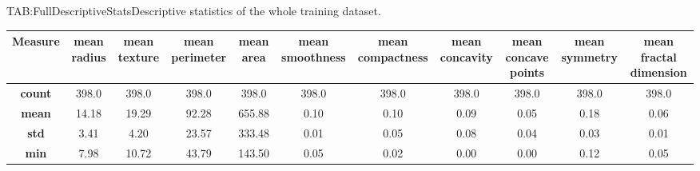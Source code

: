 
\begin{landscape}


    \begin{table}[Complete Descriptive Statistics]{TAB:FullDescriptiveStats}{Descriptive statistics of the whole training dataset.}
        \small
        \begin{adjustbox}{width=1\linewidth}
            \begin{tabular}{|c|*{10}{c|}}
                \hline
                \textbf{Measure} & \textbf{\bfseries mean radius} & \textbf{\bfseries mean texture} & \textbf{\bfseries mean perimeter} & \textbf{\bfseries mean area} & \textbf{\bfseries mean smoothness} & \textbf{\bfseries mean compactness} & \textbf{\bfseries mean concavity} & \textbf{\bfseries mean concave points} & \textbf{\bfseries mean symmetry} & \textbf{\bfseries mean fractal dimension} \\
                \hline\hline
                \textbf{count}   & 398.0                          & 398.0                           & 398.0                             & 398.0                        & 398.0                              & 398.0                               & 398.0                             & 398.0                                  & 398.0                            & 398.0                                     \\
                \hline
                \textbf{mean}    & 14.18                          & 19.29                           & 92.28                             & 655.88                       & 0.10                               & 0.10                                & 0.09                              & 0.05                                   & 0.18                             & 0.06                                      \\
                \hline
                \textbf{std}     & 3.41                           & 4.20                            & 23.57                             & 333.48                       & 0.01                               & 0.05                                & 0.08                              & 0.04                                   & 0.03                             & 0.01                                      \\
                \hline
                \textbf{min}     & 7.98                           & 10.72                           & 43.79                             & 143.50                       & 0.05                               & 0.02                                & 0.00                              & 0.00                                   & 0.12                             & 0.05                                      \\

\end{tabular}
\end{adjustbox}
\end{table}
\end{landscape}
